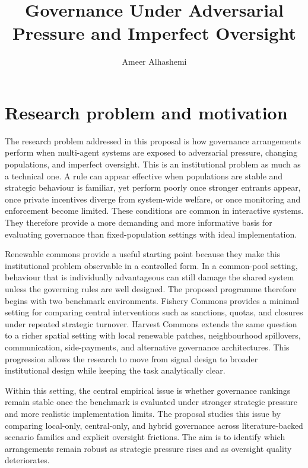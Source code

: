 \documentclass[10pt]{article}
\title{\vspace{-1em}Governance Under Adversarial Pressure and Imperfect Oversight}
\author{Ameer Alhashemi}
\date{}
\begin{document}
\maketitle
\vspace{-2.4em}

\section{Research problem and motivation}

The research problem addressed in this proposal is how governance arrangements perform when multi-agent systems are exposed to adversarial pressure, changing populations, and imperfect oversight. This is an institutional problem as much as a technical one. A rule can appear effective when populations are stable and strategic behaviour is familiar, yet perform poorly once stronger entrants appear, once private incentives diverge from system-wide welfare, or once monitoring and enforcement become limited. These conditions are common in interactive systems. They therefore provide a more demanding and more informative basis for evaluating governance than fixed-population settings with ideal implementation.

Renewable commons provide a useful starting point because they make this institutional problem observable in a controlled form. In a common-pool setting, behaviour that is individually advantageous can still damage the shared system unless the governing rules are well designed. The proposed programme therefore begins with two benchmark environments. Fishery Commons provides a minimal setting for comparing central interventions such as sanctions, quotas, and closures under repeated strategic turnover. Harvest Commons extends the same question to a richer spatial setting with local renewable patches, neighbourhood spillovers, communication, side-payments, and alternative governance architectures. This progression allows the research to move from signal design to broader institutional design while keeping the task analytically clear.

Within this setting, the central empirical issue is whether governance rankings remain stable once the benchmark is evaluated under stronger strategic pressure and more realistic implementation limits. The proposal studies this issue by comparing local-only, central-only, and hybrid governance across literature-backed scenario families and explicit oversight frictions. The aim is to identify which arrangements remain robust as strategic pressure rises and as oversight quality deteriorates.
\end{document}
